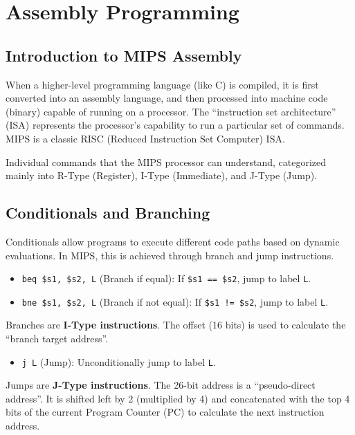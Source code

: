 \chapter{Assembly Programming}

\section{Introduction to MIPS Assembly}

When a higher-level programming language (like C) is compiled, it is first converted into an assembly language, and then processed into machine code (binary) capable of running on a processor. The ``instruction set architecture'' (ISA) represents the processor's capability to run a particular set of commands. MIPS is a classic RISC (Reduced Instruction Set Computer) ISA. 

\begin{vocabulary}
Individual commands that the MIPS processor can understand, categorized mainly into R-Type (Register), I-Type (Immediate), and J-Type (Jump).
\end{vocabulary}

\section{Conditionals and Branching}

Conditionals allow programs to execute different code paths based on dynamic evaluations. In MIPS, this is achieved through branch and jump instructions.

\begin{definition}
\begin{itemize}
    \item \texttt{beq \$s1, \$s2, L} (Branch if equal): If \texttt{\$s1 == \$s2}, jump to label \texttt{L}.
    \item \texttt{bne \$s1, \$s2, L} (Branch if not equal): If \texttt{\$s1 != \$s2}, jump to label \texttt{L}.
\end{itemize}
Branches are \textbf{I-Type instructions}. The offset (16 bits) is used to calculate the ``branch target address''.
\end{definition}

\begin{definition}
\begin{itemize}
    \item \texttt{j L} (Jump): Unconditionally jump to label \texttt{L}.
\end{itemize}
Jumps are \textbf{J-Type instructions}. The 26-bit address is a ``pseudo-direct address''. It is shifted left by 2 (multiplied by 4) and concatenated with the top 4 bits of the current Program Counter (PC) to calculate the next instruction address.
\end{definition}

